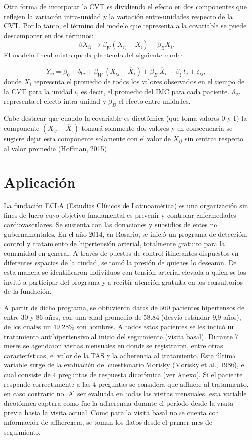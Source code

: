 \documentclass[spanish]{article}
\numberwithin{figure}{subsection}
\numberwithin{equation}{subsection}
\numberwithin{table}{subsection}
\def\npatients{560}
\begin{document}
Otra forma de incorporar la CVT es dividiendo el efecto en dos componentes que
reflejen la variación intra-unidad y la variación entre-unidades respecto de la
CVT. Por lo tanto, el término del modelo que representa a la covariable se puede
descomponer en dos términos:
\[ \beta X_{ij} \rightarrow \beta_W (X_{ij} - \overline{X}_i) + \beta_B \overline{X}_i. \]
El modelo lineal mixto queda planteado del siguiente modo:

\[ 
	Y_{ij} = \beta_0 + b_{0i} + \beta_W\ (X_{ij} - \overline{X}_i) + \beta_B\ \overline{X}_i
	+ \beta_2\ t_j + \varepsilon_{ij},
\]
donde $\overline{X}_i$ representa el promedio de todos los valores observados
en el tiempo de la CVT para la unidad $i$, es decir, el promedio del IMC para
cada paciente. $\beta_W$ representa el efecto intra-unidad y $\beta_B$ el
efecto entre-unidades.

Cabe destacar que cuando la covariable es dicotómica (que toma valores 0 y 1) la
componente $(X_{ij} - \overline{X}_i)$ tomará solamente dos valores y en
consecuencia se sugiere dejar esta componente solamente con el valor de $X_{ij}$
sin centrar respecto al valor promedio (Hoffman, 2015).

\newpage

\section{Aplicación}

La fundación ECLA (Estudios Clínicos de Latinoamérica) es una organización sin
fines de lucro cuyo objetivo fundamental es prevenir y controlar enfermedades
cardiovasculares. Se sustenta con las donaciones y subsidios de entes no
gubernamentales. En el año 2014, en Rosario, se inició un programa de detección,
control y tratamiento de hipertensión arterial, totalmente gratuito para la
comunidad en general. A través de puestos de control itinerantes dispuestos en
diferentes espacios de la ciudad, se tomó la presión de quienes lo desearon. De
esta manera se identificaron individuos con tensión arterial elevada a quien se
los invitó a participar del programa y a recibir atención gratuita en los
consultorios de la fundación. 

A partir de dicho programa, se obtuvieron datos de \npatients{} pacientes
hipertensos de entre 30 y 86 años, con una edad promedio de 58.84 (desvío
estándar 9,9 años), de los cuales un 49.28\% son hombres. A todos estos
pacientes se les indicó un tratamiento antihipertensivo al inicio del seguimiento
(visita basal). Durante 7 meses se agendaron visitas mensuales en donde se
registraron, entre otras características, el valor de la TAS y la adherencia al
tratamiento. Esta última variable surge de la evaluación del cuestionario
Morisky (Morisky et al., 1986), el cual consiste de 4 preguntas de respuesta
dicotómica (ver Anexo). Si el paciente responde correctamente a las 4 preguntas
se considera que adhiere al tratamiento, en caso contrario no. Al ser evaluada
en todas las visitas mensuales, esta variable dicotómica captura como fue la
adherencia durante el período desde la visita previa hasta la visita actual.
Como para la visita basal no se cuenta con información de adherencia, se toman
los datos desde el primer mes de seguimiento.
\end{document}
